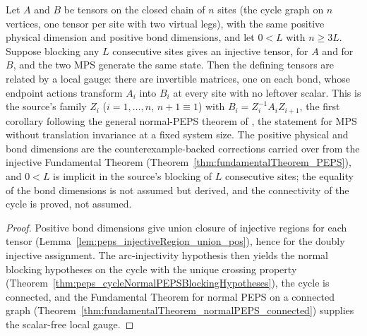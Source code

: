 \begin{corollary}%
    \label{cor:fundamentalTheorem_normalMPS_cycle}
    \leanok
    Let $A$ and $B$ be tensors on the closed chain of $n$ sites (the cycle
    graph on $n$ vertices, one tensor per site with two virtual legs), with
    the same positive physical dimension and positive bond dimensions, and
    let $0 < L$ with $n \ge 3L$.  Suppose blocking any $L$ consecutive sites
    gives an injective tensor, for $A$ and for $B$, and the two MPS generate
    the same state.  Then the defining tensors are related by a local gauge:
    there are invertible matrices, one on each bond, whose endpoint actions
    transform $A_i$ into $B_i$ at every site with no leftover scalar.  This
    is the source's family $Z_i$ ($i = 1, \dots, n$, $n + 1 \equiv 1$) with
    $B_i = Z_i^{-1} A_i Z_{i+1}$, the first corollary following the general
    normal-PEPS theorem of \cite[Section~3]{Molnar2018NormalPEPS}, the
    statement for MPS without translation invariance at a fixed system size.
    The positive physical and bond dimensions are the counterexample-backed
    corrections carried over from the injective Fundamental Theorem
    (Theorem~\ref{thm:fundamentalTheorem_PEPS}), and $0 < L$ is implicit in
    the source's blocking of $L$ consecutive sites; the equality of the bond
    dimensions is not assumed but derived, and the connectivity of the cycle
    is proved, not assumed.
\end{corollary}
\begin{proof}\leanok
    Positive bond dimensions give union closure of injective regions for
    each tensor (Lemma~\ref{lem:peps_injectiveRegion_union_pos}), hence for
    the doubly injective assignment.  The arc-injectivity hypothesis then
    yields the normal blocking hypotheses on the cycle with the unique
    crossing property
    (Theorem~\ref{thm:peps_cycleNormalPEPSBlockingHypotheses}), the cycle is
    connected, and the Fundamental Theorem for normal PEPS on a connected
    graph (Theorem~\ref{thm:fundamentalTheorem_normalPEPS_connected})
    supplies the scalar-free local gauge.
\end{proof}

